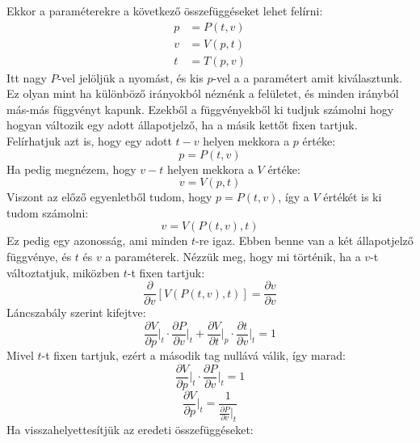 \documentclass[../main.tex]{subfiles}
\begin{document}
Ekkor a paraméterekre a következő összefüggéseket lehet felírni:
\begin{equation}
    \begin{aligned}
        p &= P(t, v) \\
        v &= V(p, t) \\
        t &= T(p, v)
    \end{aligned}
\end{equation}
Itt nagy $P$-vel jelöljük a nyomást, és kis $p$-vel a a paramétert amit kiválasztunk. Ez olyan mint ha különböző irányokból néznénk a felületet, és minden irányból más-más függvényt kapunk. Ezekből a függvényekből ki tudjuk számolni hogy hogyan változik egy adott állapotjelző, ha a másik kettőt fixen tartjuk.
Felírhatjuk azt is, hogy egy adott $t-v$ helyen mekkora a $p$ értéke:
\begin{equation}
    p = P(t, v)
\end{equation}
Ha pedig megnézem, hogy $v-t$ helyen mekkora a $V$ értéke:
\begin{equation}
    v = V(p, t)
\end{equation}
Viszont az előző egyenletből tudom, hogy $p = P(t, v)$, így a $V$ értékét is ki tudom számolni:
\begin{equation}
    v = V(P(t, v), t)
\end{equation}
Ez pedig egy azonosság, ami minden $t$-re igaz. Ebben benne van a két állapotjelző függvénye, és $t$ és $v$ a paraméterek. Nézzük meg, hogy mi történik, ha a $v$-t változtatjuk, miközben $t$-t fixen tartjuk:
\begin{equation}
    \frac{\partial}{\partial v} \left[V(P(t, v), t)\right] = \frac{\partial v}{\partial v}
\end{equation}
Láncszabály szerint kifejtve:
\begin{equation}
    \frac{\partial V}{\partial p}\bigg|_{t} \cdot \frac{\partial P}{\partial v}\bigg|_{t} + \frac{\partial V}{\partial t}\bigg|_{p} \cdot \frac{\partial t}{\partial v}\bigg|_{t} = 1
\end{equation}
Mivel $t$-t fixen tartjuk, ezért a második tag nullává válik, így marad:
\begin{equation}
    \frac{\partial V}{\partial p}\bigg|_{t} \cdot \frac{\partial P}{\partial v}\bigg|_{t} = 1
\end{equation}
\begin{equation}
    \frac{\partial V}{\partial p}\bigg|_{t} = \frac{1}{\frac{\partial P}{\partial v}\big|_{t}}
\end{equation}
Ha visszahelyettesítjük az eredeti összefüggéseket:
\end{document}
